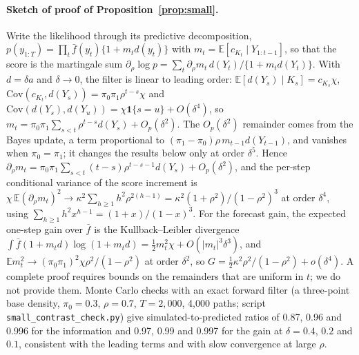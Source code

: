 \documentclass[12pt,letterpaper]{article}
\newcommand{\E}{\mathbb{E}}
\theoremstyle{plain}
\theoremstyle{remark}
\begin{document}
\paragraph{Sketch of proof of Proposition~\ref{prop:small}.} Write the likelihood through its predictive decomposition, $p(y_{1:T})=\prod_t\bar f(y_t)\{1+m_td(y_t)\}$ with $m_t=\E[c_{K_t}\mid Y_{1:t-1}]$, so that the score is the martingale sum $\partial_\rho\log p=\sum_t\partial_\rho m_t\,d(Y_t)/\{1+m_td(Y_t)\}$. With $d=\delta a$ and $\delta\to0$, the filter is linear to leading order: $\E[d(Y_s)\mid K_s]=c_{K_s}\chi$, $\mathrm{Cov}(c_{K_t},d(Y_s))=\pi_0\pi_1\rho^{t-s}\chi$ and $\mathrm{Cov}(d(Y_s),d(Y_u))=\chi\mathbf 1\{s=u\}+O(\delta^4)$, so $m_t=\pi_0\pi_1\sum_{s<t}\rho^{t-s}d(Y_s)+O_p(\delta^2)$. The $O_p(\delta^2)$ remainder comes from the Bayes update, a term proportional to $(\pi_1-\pi_0)\rho\,m_{t-1}d(Y_{t-1})$, and vanishes when $\pi_0=\pi_1$; it changes the results below only at order $\delta^5$. Hence $\partial_\rho m_t=\pi_0\pi_1\sum_{s<t}(t-s)\rho^{t-s-1}d(Y_s)+O_p(\delta^2)$, and the per-step conditional variance of the score increment is $\chi\,\E(\partial_\rho m_t)^2\to\kappa^2\sum_{h\ge1}h^2\rho^{2(h-1)}=\kappa^2(1+\rho^2)/(1-\rho^2)^3$ at order $\delta^4$, using $\sum_{h\ge1}h^2x^{h-1}=(1+x)/(1-x)^3$. For the forecast gain, the expected one-step gain over $\bar f$ is the Kullback--Leibler divergence $\int\bar f(1+m_td)\log(1+m_td)=\tfrac12m_t^2\chi+O(|m_t|^3\delta^3)$, and $\E m_t^2\to(\pi_0\pi_1)^2\chi\rho^2/(1-\rho^2)$ at order $\delta^2$, so $G=\tfrac12\kappa^2\rho^2/(1-\rho^2)+o(\delta^4)$. A complete proof requires bounds on the remainders that are uniform in $t$; we do not provide them. Monte Carlo checks with an exact forward filter (a three-point base density, $\pi_0=0.3$, $\rho=0.7$, $T=2{,}000$, 4{,}000 paths; script \texttt{small\_contrast\_check.py}) give simulated-to-predicted ratios of 0.87, 0.96 and 0.996 for the information and 0.97, 0.99 and 0.997 for the gain at $\delta=0.4$, $0.2$ and $0.1$, consistent with the leading terms and with slow convergence at large $\rho$.
\end{document}
